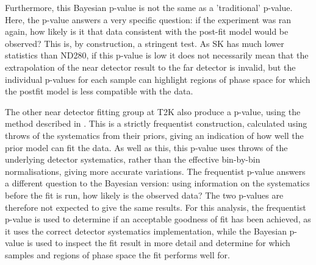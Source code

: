 Furthermore, this Bayesian p-value is not the same as a 'traditional' p-value. Here, the p-value answers a very specific question: if the experiment was ran again, how likely is it that data consistent with the post-fit model would be observed? This is, by construction, a stringent test. As SK has much lower statistics than ND280, if this p-value is low it does not necessarily mean that the extrapolation of the near detector result to the far detector is invalid, but the individual p-values for each sample can highlight regions of phase space for which the postfit model is less compatible with the data.

The other near detector fitting group at T2K also produce a p-value, using the method described in \cite{tn324}. This is a strictly frequentist construction, calculated using throws of the systematics from their priors, giving an indication of how well the prior model can fit the data. As well as this, this p-value uses throws of the underlying detector systematics, rather than the effective bin-by-bin normalisations, giving more accurate variations. The frequentist p-value answers a different question to the Bayesian version: using information on the systematics before the fit is run, how likely is the observed data? The two p-values are therefore not expected to give the same results. For this analysis, the frequentist p-value is used to determine if an acceptable goodness of fit has been achieved, as it uses the correct detector systematics implementation, while the Bayesian p-value is used to inspect the fit result in more detail and determine for which samples and regions of phase space the fit performs well for.

\newpage